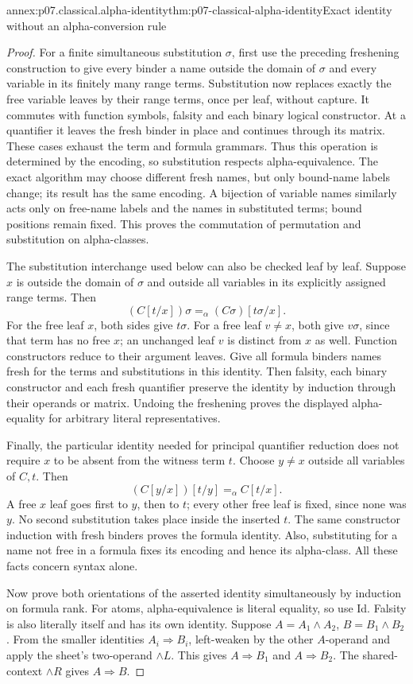 \begin{annexitem}{annex:p07.classical.alpha-identity}{thm:p07-classical-alpha-identity}{Exact identity without an alpha-conversion rule}
\begin{proof}
For a finite simultaneous substitution \(\sigma\), first use the preceding
freshening construction to give every binder a name outside the domain
of \(\sigma\) and every variable in its finitely many range terms.
Substitution now replaces exactly the free variable leaves by their range
terms, once per leaf, without capture. It commutes with function symbols,
falsity and each binary logical constructor. At a quantifier it leaves the
fresh binder in place and continues through its matrix. These cases exhaust
the term and formula grammars. Thus this operation is determined by the
encoding, so substitution respects alpha-equivalence. The exact algorithm
may choose different fresh names, but only bound-name labels change;
its result has the same encoding. A bijection of variable names similarly
acts only on free-name labels and the names in substituted terms; bound
positions remain fixed. This proves the commutation of permutation and
substitution on alpha-classes.

The substitution interchange used below can also be checked leaf by leaf.
Suppose \(x\) is outside the domain of \(\sigma\) and outside all variables
in its explicitly assigned range terms. Then
\[
 (C[t/x])\sigma=_{\alpha}(C\sigma)[t\sigma/x].
\]
For the free leaf \(x\), both sides give \(t\sigma\). For a free
leaf \(v\ne x\), both give \(v\sigma\), since that term has no free
\(x\); an unchanged leaf \(v\) is distinct from \(x\) as well.
Function constructors reduce to their argument leaves. Give all formula
binders names fresh for the terms and substitutions in this identity.
Then falsity, each binary constructor and each fresh quantifier preserve
the identity by induction through their operands or matrix. Undoing the
freshening proves the displayed alpha-equality for arbitrary literal
representatives.

Finally, the particular identity needed for principal quantifier reduction
does not require \(x\) to be absent from the witness term \(t\).
Choose \(y\ne x\) outside all variables of \(C,t\). Then
\[
 (C[y/x])[t/y]=_{\alpha}C[t/x].
\]
A free \(x\) leaf goes first to \(y\), then to \(t\); every other
free leaf is fixed, since none was \(y\). No second substitution takes
place inside the inserted \(t\). The same constructor induction with
fresh binders proves the formula identity. Also, substituting for a name
not free in a formula fixes its encoding and hence its alpha-class.
All these facts concern syntax alone.

Now prove both orientations of the asserted identity simultaneously by
induction on formula rank. For atoms, alpha-equivalence is literal equality,
so use Id. Falsity is also literally itself and has its own identity.
Suppose \(A=A_1\land A_2\), \(B=B_1\land B_2\).
From the smaller identities \(A_i\Rightarrow B_i\), left-weaken by the
other \(A\)-operand and apply the sheet's two-operand \(\land L\).
This gives \(A\Rightarrow B_1\) and \(A\Rightarrow B_2\).
The shared-context \(\land R\) gives \(A\Rightarrow B\).


\end{proof}
\end{annexitem}
